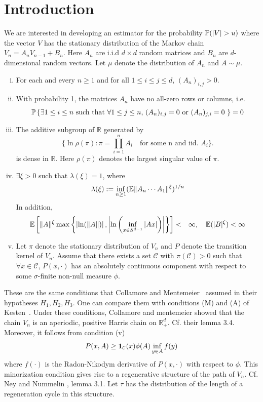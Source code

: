 \documentclass[aoas,preprint]{imsart}
\numberwithin{equation}{section}
\theoremstyle{plain}
\begin{document}
\section{Introduction}
We are interested in developing an estimator for the probability
$\P(|V| > u)$ where the vector $V$ has the stationary
distribution of the Markov chain $V_{n} = A_n V_{n-1} + B_n$. Here
$A_n$ are i.i.d $d \times d$ random matrices and $B_n$ are
$d$-dimensional random vectors. Let $\mu$ denote the distribution of
$A_n$ and $A \sim \mu$.
\begin{enumerate}[(i)]
\item For each and every $n \geq 1$ and for all
  $1 \leq i \leq j \leq d$, $(A_n)_{i,j} > 0$.
\item With probability 1, the matrices $A_n$ have no all-zero rows or
  columns, i.e.
  \[
  \P \left\{
  \text{$\exists 1 \leq i \leq n$ such that
    $\forall 1 \leq j \leq n$, $(A_n)_{i,j} = 0$ or $(A_n)_{j,i} = 0$
  }
  \right\} = 0
  \]
\item The additive subgroup of $\mathbb R$ generated by
  \[
  \{\ln \rho(\pi): \pi = \prod_{i=1}^n A_i \quad \text{for some n
    and iid. } A_i\}.
  \]
  is dense in $\mathbb R$. Here $\rho(\pi)$ denotes the largest
  singular value of $\pi$.
\item $\exists \xi > 0$ such that $\lambda(\xi) = 1$, where
  \[
  \lambda(\xi) := \inf_{n \geq 1} (\E \|A_n \cdots A_1\|^\xi)^{1/n}
  \]
  In addition,
  \begin{eqnarray*}
    \E \left[
      \|A\|^\xi \max\left\{
      \left| \ln(\|A\|) \right|,
      \left|
      \ln\left(\inf_{x \in S^{d-1}} |A x|\right) \right|
      \right\}
      \right] &<& \infty,
    \quad
    \E(|B|^\xi) < \infty
  \end{eqnarray*}
\item Let $\pi$ denote the stationary distribution of $V_n$ and $P$
  denote the transition kernel of $V_n$. Assume that
  there exists a set $\mathcal C$ with $\pi(\mathcal C) > 0$
  such that $\forall x \in \mathcal C$, $P(x, \cdot)$ has an
  absolutely continuous component with respect to some $\sigma$-finite
  non-null measure $\phi$.
\end{enumerate}
These are the same conditions that Collamore and
Mentemeier~\cite{collamore2016large} assumed in their hypotheses
$H_1, H_2, H_3$. One can compare them with conditions (M) and (A) of
Kesten~\cite{Kesten1973}. Under these conditions, Collamore and
mentemeier \cite{collamore2016large} showed that the chain $V_n$ is an
aperiodic, positive Harris chain on $\mathbb R_+^d$. Cf. their lemma
3.4. Moreover, it follows from condition (v)
\[
P(x, A) \geq \I_{\mathcal C}(x) \phi(A) \inf_{y \in A} f(y)
\]
where $f(\cdot)$ is the Radon-Nikodym derivative of $P(x, \cdot)$ with
respect to $\phi$. This minorization condition gives rise to a
regenerative structure of the path of $V_n$. Cf. Ney and Nummelin
\cite{ney1987markov}, lemma 3.1. Let $\tau$ has the distribution of
the length of a regeneration cycle in this structure.
\end{document}
